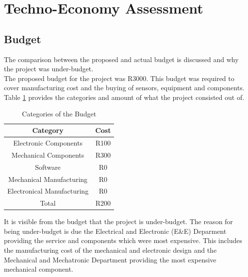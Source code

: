 \newpage



%

\section{Techno-Economy Assessment}
\label{sec:techno_eco}

\subsection{Budget}
The comparison between the proposed and actual budget is discussed and why the project was under-budget.\\

The proposed budget for the project was R3000. This budget was required to cover manufacturing cost and the buying of sensors, equipment and components. Table \ref{table:budget} provides the categories and amount of what the project consisted out of.\\

\begin{table}[h]
	\centering
	\begin{tabular}{|c|c|}
		\hline
		Category & Cost \\
		\hline
		\hline
		Electronic Components & R100 \\
		\hline
		Mechanical Components & R300 \\
		\hline 
		Software & R0 \\
		\hline
		Mechanical Manufacturing & R0 \\
		\hline
		Electronical Manufacturing & R0 \\
		\hline
		\hline 
		Total & R200 \\
		\hline
		
	\end{tabular}
	\caption{Categories of the Budget }
	\label{table:budget}
	
\end{table}

It is visible from the budget that the project is under-budget. The reason for being under-budget is due the Electrical and Electronic (E\&E) Deparment providing the service and components which were most expensive. This includes the manufacturing cost of the mechanical and electronic design and the Mechanical and Mechatronic Department providing the most expensive mechanical component.


